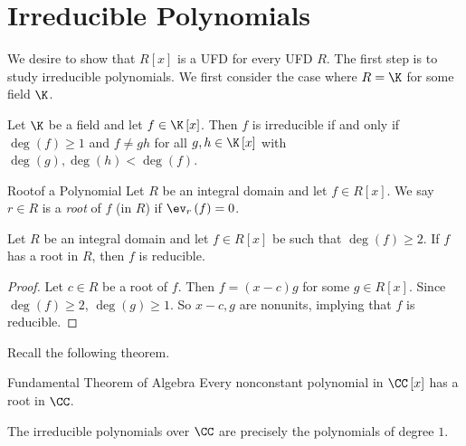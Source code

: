 \documentclass[pmath347]{subfiles}
\begin{document}

    \section{Irreducible Polynomials}
    
    \np We desire to show that $R\left[ x \right]$ is a UFD for every UFD $R$. The first step is to study irreducible polynomials. We first consider the case where $R=\K$ for some field $\K$.

    \begin{prop}{}
        Let $\K$ be a field and let $f\in\K\left[ x \right]$. Then $f$ is irreducible if and only if $\deg\left( f \right)\geq 1$ and $f\neq gh$ for all $g,h\in\K\left[ x \right]$ with $\deg\left( g \right) ,\deg\left( h \right) < \deg\left( f \right)$.
    \end{prop}

    \begin{definition}{Root}{of a Polynomial}
        Let $R$ be an integral domain and let $f\in R\left[ x \right]$. We say $r\in R$ is a \emph{root} of $f$ (in $R$) if $\ev_r\left( f \right) = 0$.
    \end{definition}

    \begin{prop}{}
        Let $R$ be an integral domain and let $f\in R\left[ x \right]$ be such that $\deg\left( f \right) \geq 2$. If $f$ has a root in $R$, then $f$ is reducible.
    \end{prop}

    \begin{proof}
        Let $c\in R$ be a root of $f$. Then $f = \left( x-c \right) g$ for some $g\in R\left[ x \right]$. Since $\deg\left( f \right) \geq 2$, $\deg\left( g \right) \geq 1$. So $x-c, g$ are nonunits, implying that $f$ is reducible.
    \end{proof}

    \noindent Recall the following theorem.

    \begin{theorem}{Fundamental Theorem of Algebra}
        Every nonconstant polynomial in $\CC\left[ x \right]$ has a root in $\CC$.
    \end{theorem}

    \begin{cor}{}
        The irreducible polynomials over $\CC$ are precisely the polynomials of degree $1$.
    \end{cor}	
\end{document}
